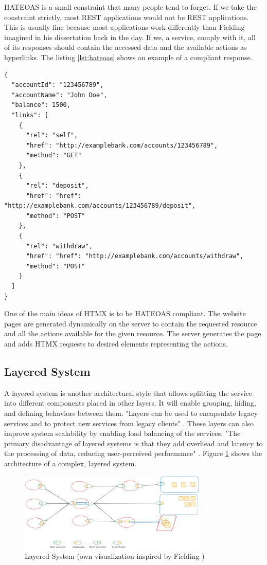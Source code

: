 HATEOAS is a small constraint that many people tend to forget. If we take the constraint strictly, most REST applications would not be REST applications. This is usually fine because most applications work differently than Fielding imagined in his dissertation back in the day. If we, a service, comply with it, all of its responses should contain the accessed data and the available actions as hyperlinks. The listing \ref{lst:hateoas} shows an example of a compliant response.

\begin{lstlisting}[caption=An HATEOAS response in JSON format,label=lst:hateoas, float]
{
  "accountId": "123456789",
  "accountName": "John Doe",
  "balance": 1500,
  "links": [
    {
      "rel": "self",
      "href": "http://examplebank.com/accounts/123456789",
      "method": "GET"
    },
    {
      "rel": "deposit",
      "href": "href": "http://examplebank.com/accounts/123456789/deposit",
      "method": "POST"
    },
    {
      "rel": "withdraw",
      "href": "href": "http://examplebank.com/accounts/withdraw",
      "method": "POST"
    }
  ]
}
\end{lstlisting}

One of the main ideas of HTMX is to be HATEOAS compliant. The website pages are generated dynamically on the server to contain the requested resource and all the actions available for the given resource. The server generates the page and adds HTMX requests to desired elements representing the actions.

\subsection{Layered System}

A layered system is another architectural style that allows splitting the service into different components placed in other layers. It will enable grouping, hiding, and defining behaviors between them. "Layers can be used to encapsulate legacy services and to protect new services from legacy clients" \cite{fielding2000}. These layers can also improve system scalability by enabling load balancing of the services. "The primary disadvantage of layered systems is that they add overhead and latency to the processing of data, reducing user-perceived performance" \cite{Clark1990ArchitecturalCF}. Figure \ref{fig:layered-system} shows the architecture of a complex, layered system.

\begin{figure}[!h]
\centering
\includegraphics[width=0.8\textwidth, keepaspectratio]{figures/layered-system.png}
\caption{Layered System (own visualization inspired by Fielding \cite{fielding2000})}
\label{fig:layered-system}
\end{figure}

